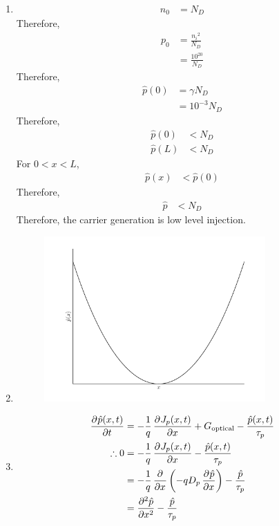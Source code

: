 \documentclass[fleqn, a4paper, 11pt, oneside]{amsart}
\theoremstyle{definition}
\theoremstyle{theorem}
\begin{document}
\begin{solution}
	\begin{enumerate}[leftmargin=*]
		\item
			\begin{align*}
				n_0 & = N_D
			\end{align*}
			Therefore,
			\begin{align*}
				p_0 & = \frac{{n_i}^2}{N_D} \\
                                    & = \frac{10^{20}}{N_D}
			\end{align*}
			Therefore,
			\begin{align*}
				\hat{p}(0) & = \gamma N_D \\
                                           & = 10^{-3} N_D
			\end{align*}
			Therefore,
			\begin{align*}
				\hat{p}(0) & < N_D \\
				\hat{p}(L) & < N_D
			\end{align*}
			For $0 < x < L$,
			\begin{align*}
				\hat{p}(x) & < \hat{p}(0)
			\end{align*}
			Therefore,
			\begin{align*}
				\hat{p} & < N_D
			\end{align*}
			Therefore, the carrier  generation is low level injection.
		\item
			\begin{figure}[H]
				\centering
				\includegraphics[width = 0.8\textwidth]{plot4.pdf}
			\end{figure}
		\item
			\begin{align*}
				\dpd{\hat{p}(x,t)}{t} & = -\frac{1}{q} \dpd{J_p(x,t)}{x} + G_{\text{optical}} - \frac{\hat{p}(x,t)}{\tau_p}     \\
				\therefore 0          & = -\frac{1}{q} \dpd{J_p(x,t)}{x} - \frac{\hat{p}(x,t)}{\tau_p}                          \\
                                                      & = -\frac{1}{q} \dpd{}{x}\left( -q D_p \dpd{\hat{p}}{x} \right) - \frac{\hat{p}}{\tau_p} \\
                                                      & = \dpd[2]{\hat{p}}{x} - \frac{\hat{p}}{\tau_p}
			\end{align*}
	\end{enumerate}
\end{solution}
\end{document}

